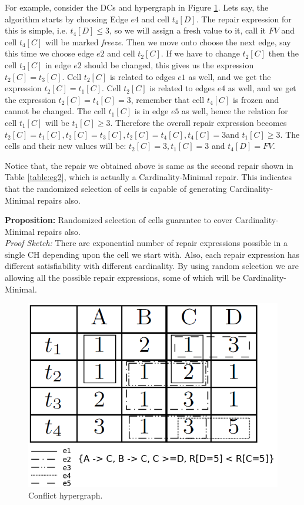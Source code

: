 For example, consider the DCs and hypergraph in Figure \ref{fig:ch}.
Lets say, the algorithm starts by choosing Edge $e4$ and cell $t_4[D]$.
The repair expression for this is simple, i.e. $t_4[D] \leq 3$, so we will assign a fresh value to it, call it $FV$ and cell $t_4[C]$ will be marked \textit{freeze}.
Then we move onto choose the next edge, say this time we choose edge $e2$ and cell $t_2[C]$.
If we have to change $t_2[C]$ then the cell $t_3[C]$ in edge $e2$ should be changed, this gives us the expression $t_2[C] = t_3[C]$.
Cell $t_2[C]$ is related to edges $e1$ as well, and we get the expression $t_2[C] = t_1[C]$.
Cell $t_2[C]$ is related to edges $e4$ as well, and we get the expression $t_2[C] = t_4[C] = 3$, remember that cell $t_4[C]$ is frozen and cannot be changed.
The cell $t_1[C]$ is in edge $e5$ as well, hence the relation for cell $t_1[C]$ will be $t_1[C] \geq 3$.
Therefore the overall repair expression becomes $t_2[C] = t_1[C], t_2[C] = t_3[C], t_2[C] = t_4[C], t_4[C] = 3 $and $t_1[C] \geq 3$.
The cells and their new values will be: $t_2[C] = 3, t_1[C] = 3$ and $t_4[D] = FV$.

Notice that, the repair we obtained above is same as the second repair shown in Table \ref{table:eg2}, which is actually a Cardinality-Minimal repair.
This indicates that the randomized selection of cells is capable of generating Cardinality-Minimal repairs also.

\textbf{Proposition:} Randomized selection of cells guarantee to cover Cardinality-Minimal repairs also. \\
\textit{Proof Sketch:} There are exponential number of repair expressions possible in a single CH depending upon the cell we start with.
Also, each repair expression has different satisfiability with different cardinality.
By using random selection we are allowing all the possible repair expressions, some of which will be Cardinality-Minimal.


\begin{figure}
   \centering
   \includegraphics[scale=0.22]{ch.png}
   \caption{Conflict hypergraph.}
   \label{fig:ch}
\end{figure}

